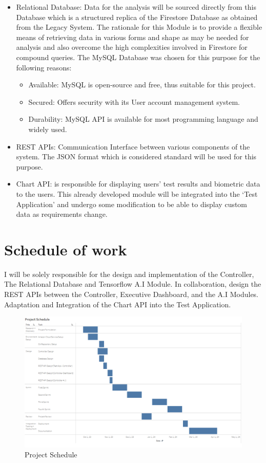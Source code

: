 \documentclass{report}
\begin{document}
\begin{itemize}
    \item{Relational Database}: Data for the analysis will be sourced directly from this Database which is a structured replica of
    the Firestore Database as obtained from the Legacy System. The rationale for this Module is to provide a flexible means of
    retrieving data in various forms and shape as may be needed for analysis and also overcome the high complexities involved
    in Firestore for compound queries. The MySQL Database was chosen for this purpose for the following reasons:
    \begin{itemize}
        \item{Available}: MySQL is open-source and free, thus suitable for this project. 
        \item {Secured}: Offers security with its User account management system.
        \item {Durability}: MySQL API is available for most programming language and widely used.
    \end{itemize}
    \item{REST APIs}: Communication Interface between various components of the system. The JSON format which is considered 
    standard will be used for this purpose.
    \item{Chart API}:  is responsible for displaying users' test results and biometric data to the users. This already developed 
    module will be integrated into the `Test Application' and undergo some modification to be able to display custom data as 
    requirements change.
    \end{itemize}
    
    \section*{Schedule of work}
    I will be solely responsible for the design and implementation of the Controller, The Relational Database and Tensorflow
    A.I Module. In collaboration, design the REST APIs between the Controller, Executive Dashboard, and the A.I Modules. 
    Adaptation and Integration of the Chart API into the Test Application. 
    \begin{figure}
        \includegraphics[scale=0.63]{images/schedule.png}
        \caption{Project Schedule}
        \label{fig:schedule}
        \centering
    \end{figure}
    \printbibliography
\end{document}

